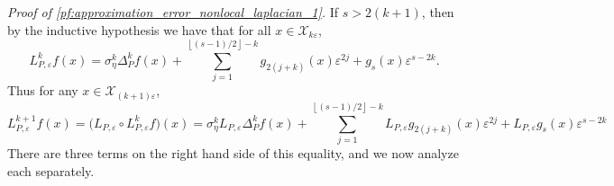 \documentclass[aos]{imsart}
\theoremstyle{plain}
\theoremstyle{definition}
\theoremstyle{remark}
\newcommand{\mc}[1]{\mathcal{#1}}
\newcommand{\floor}[1]{\left\lfloor #1 \right\rfloor}
\newcommand{\1}{\mathbf{1}}
\begin{document}
\emph{Proof of \eqref{pf:approximation_error_nonlocal_laplacian_1}.} If $s > 2(k + 1)$, then by the inductive hypothesis we have that for all $x \in \mc{X}_{k\varepsilon}$, 
\begin{equation*}
L_{P,\varepsilon}^kf(x) = \sigma_{\eta}^k \Delta_P^kf(x) + \sum_{j = 1}^{\floor{(s - 1)/2} - k} g_{2(j + k)}(x) \varepsilon^{2j} + g_s(x) \varepsilon^{s - 2k}.
\end{equation*}
Thus for any $x \in \mc{X}_{(k + 1)\varepsilon}$, 
\begin{equation*}
L_{P,\varepsilon}^{k + 1}f(x) = \bigl(L_{P,\varepsilon} \circ L_{P,\varepsilon}^k f\bigr)(x) = \sigma_{\eta}^k L_{P,\varepsilon}\Delta_P^kf(x) + \sum_{j = 1}^{\floor{(s - 1)/2} - k} L_{P,\varepsilon}g_{2(j + k)}(x) \varepsilon^{2j} + L_{P,\varepsilon}g_s(x) \varepsilon^{s - 2k}
\end{equation*}
There are three terms on the right hand side of this equality, and we now analyze each separately.
\end{document}
